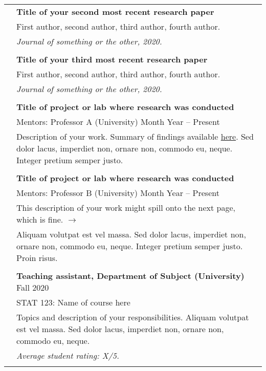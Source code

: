 \documentclass[letterpaper, 11pt]{article}
\begin{document}
\begin{longtable}{p{1.3in}p{4.8in}}
& \textbf{Title of your second most recent research paper} \\
& First author, second author, third author, fourth author. \\
& \textit{Journal of something or the other, 2020.}\\
& \\

& \textbf{Title of your third most recent research paper} \\
& First author, second author, third author, fourth author. \\
& \textit{Journal of something or the other, 2020.}\\
& \\


\nohyphens{\color{OliveGreen}{Research experience}} 
& \textbf{Title of project or lab where research was conducted} \\
& Mentors: Professor A (University) \hfill Month Year -- Present \\
& Description of your work. Summary of findings available \href{https://en.wikibooks.org/wiki/LaTeX/Hyperlinks}{here}. Sed dolor lacus, imperdiet non, ornare non, commodo eu, neque. Integer pretium semper justo. \\
& \\

& \textbf{Title of project or lab where research was conducted} \\
& Mentors: Professor B (University) \hfill Month Year -- Present \\
& This description of your work might spill onto the next page, which is fine. \hfill $\rightarrow$ \\
& Aliquam volutpat est vel massa. Sed dolor lacus, imperdiet non, ornare non, commodo eu, neque. Integer pretium semper justo. Proin risus. \\
& \\


{\color{OliveGreen}{Teaching experience}} 
& \textbf{Teaching assistant, Department of Subject (University)} \hfill Fall 2020 \\
& STAT 123: Name of course here \\
& Topics and description of your responsibilities. Aliquam volutpat est vel massa. Sed dolor lacus, imperdiet non, ornare non, commodo eu, neque. \\
& \textit{Average student rating: X/5.} \\
& \\


\end{longtable}
\end{document}
